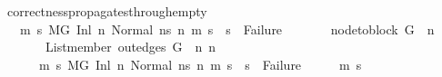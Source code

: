 \begin{isabellebody}
\isanewline
{}\isamarkupfalse%
%
\endisatagproof
{\isafoldproof}%
%
\isadelimproof
\isanewline
%
\endisadelimproof
\isanewline
{}\isamarkupfalse%
\ correctness{\isacharunderscore}{\kern0pt}propagates{\isacharunderscore}{\kern0pt}through{\isacharunderscore}{\kern0pt}empty{\isacharcolon}{\kern0pt}\isanewline
\ \ \ {\isachardoublequoteopen}{\isasymforall}m\ s{\isachardot}{\kern0pt}\ {\isacharparenleft}{\kern0pt}M{\isacharcomma}{\kern0pt}{\isasymLambda}{\isacharcomma}{\kern0pt}{\isasymGamma}{\isacharcomma}{\kern0pt}{\isasymOmega}{\isacharcomma}{\kern0pt}G\ {\isasymturnstile}{\isacharparenleft}{\kern0pt}Inl\ n{}{\isacharcomma}{\kern0pt}\ Normal\ ns{}{\isacharparenright}{\kern0pt}\ {\isacharminus}{\kern0pt}n{\isasymrightarrow}{\isacharasterisk}{\kern0pt}\ {\isacharparenleft}{\kern0pt}m{\isacharcomma}{\kern0pt}\ s{\isacharparenright}{\kern0pt}{\isacharparenright}{\kern0pt}\ {\isasymlongrightarrow}\ s\ {\isasymnoteq}\ Failure{\isachardoublequoteclose}\isanewline
\ \ \ \ \ \ \ {\isachardoublequoteopen}node{\isacharunderscore}{\kern0pt}to{\isacharunderscore}{\kern0pt}block\ G\ {\isacharbang}{\kern0pt}\ n{}\ {\isacharequal}{\kern0pt}\ {\isacharbrackleft}{\kern0pt}{\isacharbrackright}{\kern0pt}{\isachardoublequoteclose}\isanewline
\ \ \ \ \ \ \ {\isachardoublequoteopen}List{\isachardot}{\kern0pt}member\ {\isacharparenleft}{\kern0pt}out{\isacharunderscore}{\kern0pt}edges\ G\ {\isacharbang}{\kern0pt}\ n{}{\isacharparenright}{\kern0pt}\ n{}{\isachardoublequoteclose}\isanewline
\ \ \ \ \ {\isachardoublequoteopen}{\isasymAnd}\ m\ s{\isachardot}{\kern0pt}\ {\isacharparenleft}{\kern0pt}M{\isacharcomma}{\kern0pt}{\isasymLambda}{\isacharcomma}{\kern0pt}{\isasymGamma}{\isacharcomma}{\kern0pt}{\isasymOmega}{\isacharcomma}{\kern0pt}G\ {\isasymturnstile}{\isacharparenleft}{\kern0pt}Inl\ n{}{\isacharcomma}{\kern0pt}\ Normal\ ns{}{\isacharparenright}{\kern0pt}\ {\isacharminus}{\kern0pt}n{\isasymrightarrow}{\isacharasterisk}{\kern0pt}\ {\isacharparenleft}{\kern0pt}m{\isacharcomma}{\kern0pt}\ s{\isacharparenright}{\kern0pt}{\isacharparenright}{\kern0pt}\ {\isasymLongrightarrow}\ s\ {\isasymnoteq}\ Failure{\isachardoublequoteclose}\isanewline
%
\isadelimproof
%
\endisadelimproof
%
\isatagproof
{}\isamarkupfalse%
\ {\isacharminus}{\kern0pt}\isanewline
\ \ \isamarkupfalse%
\ m{}\ s{}\isanewline
\ \ \isamarkupfalse%

\end{isabellebody}
